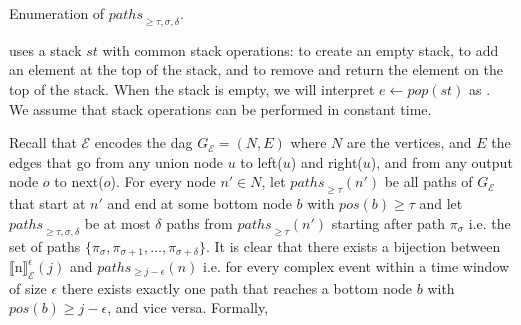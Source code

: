 \begin{algorithm}[H]
  \DontPrintSemicolon
  \SetAlgoNoEnd %
  \SetAlgoNoLine %
\caption{Enumeration of ${paths}_{\ge \tau, \sigma, \delta}$.}
\label{algo:enumeration}
\end{algorithm}

 uses a stack $st$ with common stack operations:  to create an empty stack,  to add an element  at the top of the stack, and  to remove and return the element on the top of the stack. When the stack is empty, we will interpret $e \leftarrow pop(st)$ as . We assume that stack operations can be performed in constant time.

Recall that $\mathcal{E}$ encodes the \acrshort{dag} $G_{\mathcal{E}} = (N, E)$ where $N$ are the vertices, and $E$ the edges that go from any union node $u$ to left($u$) and right($u$), and from any output node $o$ to next($o$). For every node $n' \in N$, let ${paths}_{\ge \tau}(n')$ be all paths of $G_{\mathcal{E}}$ that start at $n'$ and end at some bottom node $b$ with $pos(b) \ge \tau$ and let ${paths}_{\ge \tau, \sigma, \delta}$ be at most $\delta$ paths from ${paths}_{\ge \tau}(n')$ starting after path $\pi_{\sigma}$ i.e. the set of paths $\{ \pi_{\sigma}, \pi_{\sigma+1}, \ldots, \pi_{\sigma+\delta}\}$. It is clear that there exists a bijection between ${\llbracket \text{n} \rrbracket}^{\epsilon}_{\mathcal{E}}(j)$ and $paths_{\ge j - \epsilon}(n)$ i.e. for every complex event within a time window of size $\epsilon$ there exists exactly one path that reaches a bottom node $b$ with $pos(b) \ge j - \epsilon$, and vice versa. Formally,

